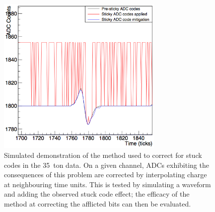 \begin{figure}
  \centering
  \includegraphics[width=8cm]{stuckbitsremoval.png}
  \caption[Correcting for stuck codes in the 35~ton data]{Simulated demonstration of the method used to correct for stuck codes in the 35~ton data.  On a given channel, ADCs exhibiting the consequences of this problem are corrected by interpolating charge at neighbouring time units.  This is tested by simulating a waveform and adding the observed stuck code effect; the efficacy of the method at correcting the afflicted bits can then be evaluated.}
  \label{fig:StuckBitInterpolation}
\end{figure}

